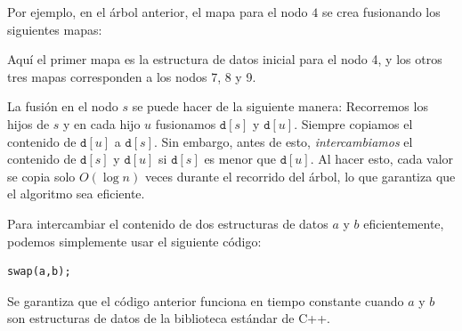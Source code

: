 Por ejemplo, en el árbol anterior, el mapa
para el nodo $4$ se crea fusionando los siguientes mapas:

\begin{center}
\end{center}

Aquí el primer mapa es la estructura de datos inicial
para el nodo 4,
y los otros tres mapas corresponden a los nodos 7, 8 y 9.

La fusión en el nodo $s$ se puede hacer de la siguiente manera:
Recorremos los hijos de $s$
y en cada hijo $u$ fusionamos $\texttt{d}[s]$
y $\texttt{d}[u]$.
Siempre copiamos el contenido de $\texttt{d}[u]$
a $\texttt{d}[s]$.
Sin embargo, antes de esto, \emph{intercambiamos}
el contenido de $\texttt{d}[s]$ y $\texttt{d}[u]$
si $\texttt{d}[s]$ es menor que $\texttt{d}[u]$.
Al hacer esto, cada valor se copia solo $O(\log n)$
veces durante el recorrido del árbol,
lo que garantiza que el algoritmo sea eficiente.

Para intercambiar el contenido de dos estructuras de datos $a$ y $b$
eficientemente, podemos simplemente usar el siguiente código:
\begin{lstlisting}
swap(a,b);
\end{lstlisting}
Se garantiza que el código anterior funciona en tiempo constante
cuando $a$ y $b$ son estructuras de datos de la biblioteca estándar de C++.

